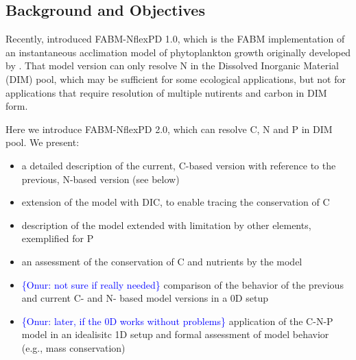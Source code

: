 \documentclass[gmd, manuscript, draft]{copernicus}
\newcommand{\onur}[1]{\textcolor{blue}{\{Onur: #1\}}}
\begin{document}
\subsection{Background and Objectives}
Recently, \citet{Kerimoglu2021} introduced FABM-NflexPD 1.0, which is the FABM \citep[Framework for Aquatic Biogeochemical Models][]{Bruggeman2014} implementation of an instantaneous acclimation model of phytoplankton growth originally developed by \citet{Smith2016}. That model version can only resolve N in the Dissolved Inorganic Material (DIM) pool, which may be sufficient for some ecological applications, %
but not for applications that require resolution of multiple nutirents and carbon in DIM form.

Here we introduce FABM-NflexPD 2.0, which can resolve C, N and P in DIM pool. We present:
\begin{itemize}
 \item a detailed description of the current, C-based version with reference to the previous, N-based version (see below)
 \item extension of the model with DIC, to enable tracing the conservation of C
 \item description of the model extended with limitation by other elements, exemplified for P
 \item an assessment of the conservation of C and nutrients by the model
 \item \onur{not sure if really needed} comparison of the behavior of the previous and current C- and N- based model versions in a 0D setup  %
 \item \onur{later, if the 0D works without problems} application of the C-N-P model in an idealisitc 1D setup and formal assessment of model behavior (e.g., mass conservation)
\end{itemize}

\end{document}
